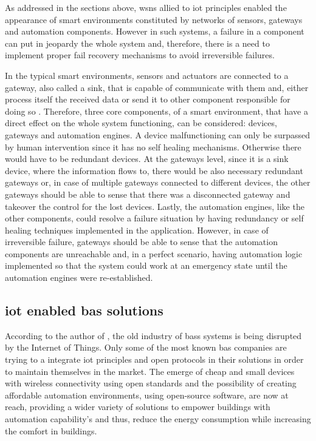 As addressed in the sections above, \ac{wsn}s allied to \ac{iot} principles enabled the appearance of smart environments constituted by networks of sensors, gateways and automation components. However in such systems, a failure in a component can put in jeopardy the whole system and, therefore, there is a need to implement proper fail recovery mechanisms to avoid irreversible failures.

In the typical smart environments, sensors and actuators are connected to a gateway, also called a sink, that is capable of communicate with them and, either process itself the received data or send it to other component responsible for doing so \cite{Gia2015}. Therefore, three core components, of a smart environment, that have a direct effect on the whole system functioning, can be considered: devices, gateways and automation engines. A device malfunctioning can only be surpassed by human intervention since it has no self healing mechanisms. Otherwise there would have to be redundant devices. At the gateways level, since it is a sink device, where the information flows to, there would be also necessary redundant gateways or, in case of multiple gateways connected to different devices, the other gateways should be able to sense that there was a disconnected gateway and takeover the control for the lost devices. Lastly, the automation engines, like the other components, could resolve a failure situation by having redundancy or self healing techniques implemented in the application. However, in case of irreversible failure, gateways should be able to sense that the automation components are unreachable and, in a perfect scenario, having automation logic implemented so that the system could work at an emergency state until the automation engines were re-established.

\subsection{\ac{iot} enabled \ac{bas} solutions}

According to the author of \cite{TransformativeWave}, the old industry of \ac{bas}s systems is being disrupted by the Internet of Things. Only some of the most known \ac{bas} companies are trying to a integrate \ac{iot} principles and open protocols in their solutions in order to maintain themselves in the market. The emerge of cheap and small devices with wireless connectivity using open standards and the possibility of creating affordable automation environments, using open-source software, are now at reach, providing a wider variety of solutions to empower buildings with automation capability's and thus, reduce the energy consumption while increasing the comfort in buildings.

